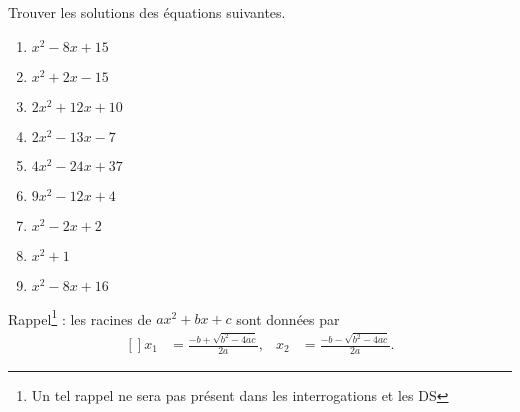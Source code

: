
\begin{exercice}\label{exoPremiere-0069}

    Trouver les solutions des équations suivantes.
    \begin{multicols}{3}
        \begin{enumerate}
            \item
                \( x^2-8x+15\)
            \item
                \( x^2+2x-15\)
            \item
                \( 2x^2+12x+10\)
            \item
                \( 2x^2-13x-7\)
            \item
                \( 4x^2-24x+37\)
            \item
                \( 9x^2-12x+4\)
            \item
                \( x^2-2x+2\)
            \item
                \( x^2+1\)
            \item
                \( x^2-8x+16\)
        \end{enumerate}
    \end{multicols}

    Rappel\footnote{Un tel rappel ne sera pas présent dans les interrogations et les DS} : les racines de \( ax^2+bx+c\) sont données par
    \begin{equation}
        \begin{aligned}[]
            x_1&=\frac{ -b+\sqrt{b^2-4ac} }{ 2a },&x_2&=\frac{ -b-\sqrt{b^2-4ac} }{ 2a }.
        \end{aligned}
    \end{equation}

\end{exercice}
